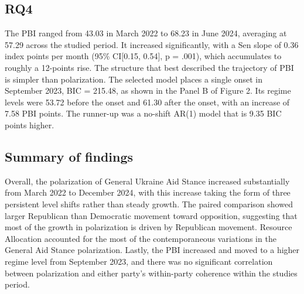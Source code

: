 \subsection{RQ4}

The PBI ranged from 43.03 in March 2022 to 68.23 in June 2024, averaging at 57.29 across the studied period. It increased significantly, with a Sen slope of 0.36 index points per month (95\% CI[0.15, 0.54], p = .001), which accumulates to roughly a 12-points rise. The structure that best described the trajectory of PBI is simpler than polarization. The selected model places a single onset in September 2023, BIC = 215.48, as shown in the Panel B of Figure 2. Its regime levels were 53.72 before the onset and 61.30 after the onset, with an increase of 7.58 PBI points. The runner-up was a no-shift AR(1) model that is 9.35 BIC points higher.

\subsection{Summary of findings}

Overall, the polarization of General Ukraine Aid Stance increased substantially from March 2022 to December 2024, with this increase taking the form of three persistent level shifts rather than steady growth. The paired comparison showed larger Republican than Democratic movement toward opposition, suggesting that most of the growth in polarization is driven by Republican movement. Resource Allocation accounted for the most of the contemporaneous variations in the General Aid Stance polarization. Lastly, the PBI increased and moved to a higher regime level from September 2023, and there was no significant correlation between polarization and either party's within-party coherence within the studies period.

